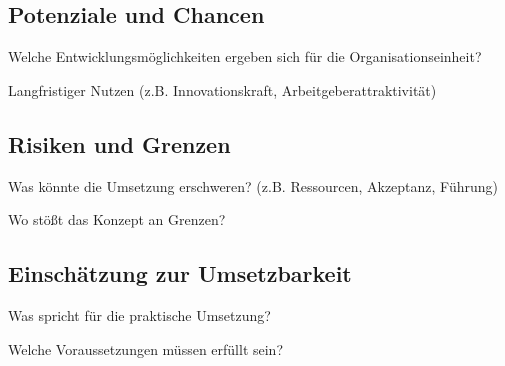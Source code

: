 \documentclass[12pt,a4paper]{article}
\begin{document}
	\subsection{Potenziale und Chancen}
	Welche Entwicklungsmöglichkeiten ergeben sich für die Organisationseinheit?
	
	Langfristiger Nutzen (z.B. Innovationskraft, Arbeitgeberattraktivität)
	\subsection{Risiken und Grenzen}
	Was könnte die Umsetzung erschweren? (z.B. Ressourcen, Akzeptanz, Führung)
	
	Wo stößt das Konzept an Grenzen?
	
	\subsection{Einschätzung zur Umsetzbarkeit}
	Was spricht für die praktische Umsetzung?
	
	Welche Voraussetzungen müssen erfüllt sein?
	
	\newpage
	\printbibliography[heading=bibintoc,title={Literaturverzeichnis}]
	
\end{document}
